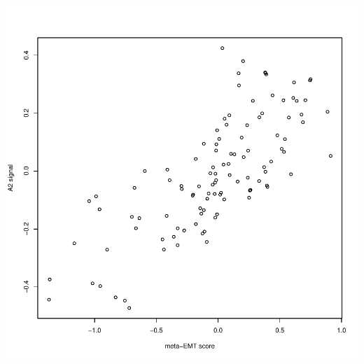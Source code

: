 \documentclass{article}\usepackage[]{graphicx}\usepackage[]{color}
\makeatletter
\def\maxwidth{ %
  \ifdim\Gin@nat@width>\linewidth
    \linewidth
  \else
    \Gin@nat@width
  \fi
}
\newenvironment{knitrout}{}{} %
\makeatother
\begin{document}
\begin{knitrout}
{\centering \includegraphics[width=\maxwidth]{figure/nmf-msigdb-cor-plots-10} 

}



\end{knitrout}
\end{document}
